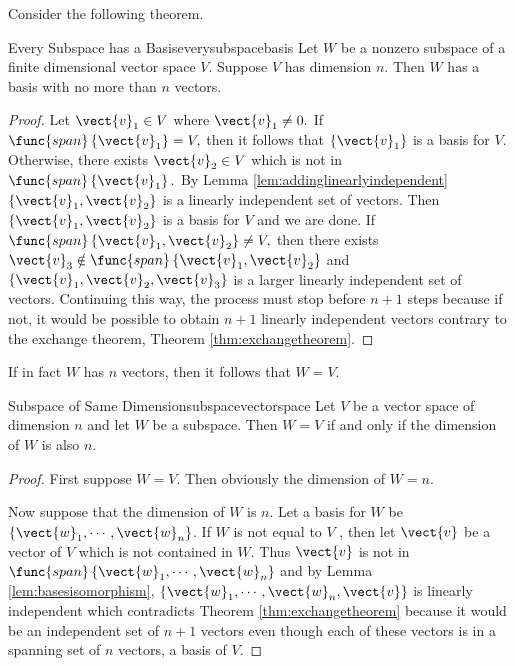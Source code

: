 Consider the following theorem. 

\begin{theorem}{Every Subspace has a Basis}{everysubspacebasis}
Let $W$ be a nonzero subspace of a finite dimensional vector
space $V$. Suppose $V$ has dimension $n$.
Then $W$ has a basis
with no more than $n$ vectors.
\end{theorem}

\begin{proof}
Let $\vect{v}_{1}\in V$ where $\vect{v}_{1}\neq 0.$ If $
\func{span}\left\{ \vect{v}_{1}\right\} =V,$ then it follows that $\left\{ \vect{v}
_{1}\right\} $ is a basis for $V$. Otherwise, there exists $\vect{v}
_{2}\in V$ which is not in $\func{span}\left\{ \vect{v}_{1}\right\} .$ By
Lemma \ref{lem:addinglinearlyindependent} $\left\{ \vect{v}_{1},\vect{v}_{2}\right\} $ is a
linearly independent set of vectors. Then $\left\{ \vect{v}_{1},\vect{v}
_{2}\right\} $ is a basis for $V$ and we are done. If $\func{span}\left\{ \vect{v}_{1},
\vect{v}_{2}\right\} \neq V,$ then there exists $\vect{v}_{3}\notin \func{
span}\left\{ \vect{v}_{1},\vect{v}_{2}\right\} $ and $\left\{ \vect{v}
_{1},\vect{v}_{2},\vect{v}_{3}\right\} $ is a larger linearly
independent set of vectors. Continuing this way, the process must stop
before $n+1$ steps because if not, it would be possible to obtain $n+1$
linearly independent vectors contrary to the exchange theorem, Theorem \ref{thm:exchangetheorem}. 
\end{proof}

If in fact $W$ has $n$ vectors, then it follows that $W=V$. 

\begin{theorem}{Subspace of Same Dimension}{subspacevectorspace}
Let $V$ be a vector space of dimension $n$ and let $W$ be a
subspace. Then $W=V$ if and only if the dimension of $W$ is also $n$.
\end{theorem}

\begin{proof}First suppose $W=V.$ Then obviously the dimension of $W=n.$

Now suppose that the dimension of $W$ is $n$. Let a basis for $W$ be $
\left\{ \vect{w}_{1},\cdots ,\vect{w}_{n}\right\} $. If $W$ is not equal to $V$
, then let $\vect{v}$ be a vector of $V$ which is not contained in $W.$ Thus $
\vect{v}$ is not in $\func{span}\left\{ \vect{w}_{1},\cdots ,\vect{w}
_{n}\right\} $ and by Lemma \ref{lem:basesisomorphism}, $\left\{ \vect{w}_{1},\cdots ,\vect{w}_{n},\vect{v}\right\} $ is linearly independent which contradicts
Theorem \ref{thm:exchangetheorem} because it would be an independent set of $n+1$
vectors even though each of these vectors is in a spanning set of $n$
vectors, a basis of $V$. 
\end{proof}

